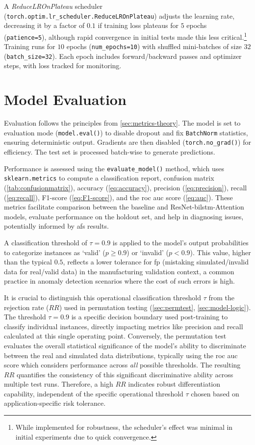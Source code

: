 A \textit{ReduceLROnPlateau} scheduler (\texttt{torch.optim.lr\_scheduler.ReduceLROnPlateau}) adjusts the learning rate, decreasing it by a factor of $0.1$ if training loss plateaus for $5$ epochs (\texttt{patience=5}), although rapid convergence in initial tests made this less critical.\footnote{While implemented for robustness, the scheduler's effect was minimal in initial experiments due to quick convergence.} Training runs for $10$ epochs (\texttt{num\_epochs=10}) with shuffled mini-batches of size $32$ (\texttt{batch\_size=32}). Each epoch includes forward/backward passes and optimizer steps, with loss tracked for monitoring.

\section{Model Evaluation}

Evaluation follows the principles from \autoref{sec:metrics-theory}. The model is set to evaluation mode (\texttt{model.eval()}) to disable dropout and fix \texttt{BatchNorm} statistics, ensuring deterministic output. Gradients are then disabled (\texttt{torch.no\_grad()}) for efficiency. The test set is processed batch-wise to generate predictions.

Performance is assessed using the \texttt{evaluate\_model()} method, which uses \texttt{sklearn.metrics} to compute a classification report, confusion matrix (\autoref{tab:confusionmatrix}), accuracy (\autoref{eq:accuracy}), precision (\autoref{eq:precision}), recall (\autoref{eq:recall}), F1-score (\autoref{eq:F1-score}), and the \gls{roc} \gls{auc} score (\autoref{eq:auc}). These metrics facilitate comparison between the baseline and ResNet-\gls{bilstm}-Attention models, evaluate performance on the holdout set, and help in diagnosing issues, potentially informed by \gls{afs} results.

A classification threshold of $\tau = 0.9$ is applied to the model's output probabilities to categorize instances as `valid' ($p \geq 0.9$) or `invalid' ($p < 0.9$). This value, higher than the typical $0.5$, reflects a lower tolerance for \gls{fp} (mistaking simulated/invalid data for real/valid data) in the manufacturing validation context, a common practice in anomaly detection scenarios where the cost of such errors is high.

It is crucial to distinguish this operational classification threshold $\tau$ from the rejection rate ($RR$) used in permutation testing (\autoref{sec:permtest}, \autoref{sec:model-logic}). The threshold $\tau=0.9$ is a specific decision boundary used post-training to classify individual instances, directly impacting metrics like precision and recall calculated at this single operating point. Conversely, the permutation test evaluates the overall statistical significance of the model's ability to discriminate between the real and simulated data distributions, typically using the \gls{roc} \gls{auc} score which considers performance across \textit{all} possible thresholds. The resulting $RR$ quantifies the consistency of this significant discriminative ability across multiple test runs. Therefore, a high $RR$ indicates robust differentiation capability, independent of the specific operational threshold $\tau$ chosen based on application-specific risk tolerance.